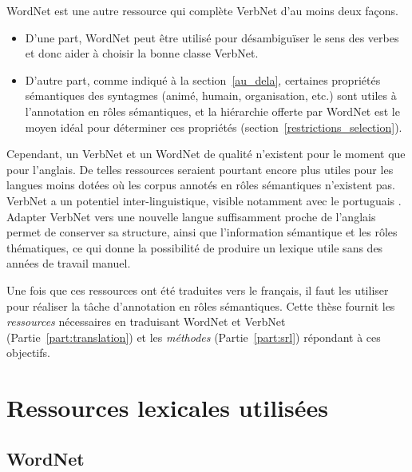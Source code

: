 
WordNet \citep{fellbaum1998wordnet} est une autre ressource qui complète
VerbNet d'au moins deux façons.

\begin{itemize}
    \item D'une part, WordNet peut être utilisé pour désambiguïser le sens des
        verbes et donc aider à choisir la bonne classe VerbNet.
    \item D'autre part, comme indiqué à la section~\ref{au_dela}, certaines
        propriétés sémantiques des syntagmes (animé, humain, organisation,
        etc.) sont utiles à l'annotation en rôles sémantiques, et la hiérarchie
        offerte par WordNet est le moyen idéal pour déterminer ces propriétés
        (section~\ref{restrictions_selection}).
\end{itemize}

Cependant, un VerbNet et un WordNet de qualité n'existent pour le moment que
pour l'anglais. De telles ressources seraient pourtant encore plus utiles pour
les langues moins dotées où les corpus annotés en rôles sémantiques n'existent
pas. VerbNet a un potentiel inter-linguistique, visible notamment avec le
portuguais \citep[section 2.2.2]{kipperschuler2005verbnet}. Adapter VerbNet
vers une nouvelle langue suffisamment proche de l'anglais permet de conserver
sa structure, ainsi que l'information sémantique et les rôles thématiques, ce
qui donne la possibilité de produire un lexique utile sans des années de
travail manuel.

Une fois que ces ressources ont été traduites vers le français, il faut les
utiliser pour réaliser la tâche d'annotation en rôles sémantiques. Cette thèse
fournit les \textit{ressources} nécessaires en traduisant WordNet et VerbNet
(Partie~\ref{part:translation}) et les \textit{méthodes} (Partie~\ref{part:srl})
répondant à ces objectifs.

\section{Ressources lexicales utilisées}
\label{ressources_utilisees}

\subsection{WordNet}
\label{presentation_wordnet}

